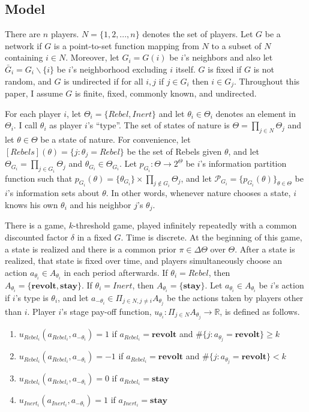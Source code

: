 \documentclass[12pt,letterpaper]{article}
\theoremstyle{definition}
\theoremstyle{remark}
\theoremstyle{claim}
\begin{document}
\subsection{Model}


There are $n$ players. $N=\{1,2,...,n\}$ denotes the set of players.  Let $G$ be a network if  $G$ is a point-to-set function mapping from $N$ to a subset of $N$ containing $i\in N$. Moreover,  let $G_i=G(i)$ be $i$'s neighbors and also let $\bar{G}_i=G_i\backslash \{i\}$ be $i$'s neighborhood excluding $i$ itself. $G$ is fixed if $G$ is not random, and $G$ is undirected if for all $i,j$ if $j\in G_i$ then $i\in G_j$. Throughout this paper, I assume $G$ is finite, fixed, commonly known, and undirected. 

For each player $i$, let $\Theta_i=\{Rebel,Inert\}$ and let $\theta_i\in \Theta_i$ denotes an element in $\Theta_i$. I call $\theta_i$ as player $i$'s ``type''. The set of states of nature is $\Theta=\prod_{j\in N}\Theta_j$ and let $\theta\in \Theta$ be a state of nature. For convenience, let $[Rebels](\theta)=\{j:\theta_j=Rebel\}$ be the set of Rebels given $\theta$, and let $\Theta_{G_i}=\prod_{j\in G_i}\Theta_j$ and $\theta_{G_i}\in \Theta_{G_i}$. Let $p_{G_i}:\Theta \rightarrow 2^{\Theta}$ be $i$'s information partition function such that $p_{G_i}(\theta)=\{\theta_{G_i}\}\times \prod_{j\not\in G_i}\Theta_j$, and let $\mathcal{P}_{G_i}=\{p_{G_i}(\theta)\}_{\theta\in \Theta}$ be $i$'s information sets about $\theta$. In other words, whenever nature chooses a state, $i$ knows his own $\theta_i$ and his neighbor $j$'s $\theta_j$. 

There is a game, $k$-threshold game, played infinitely repeatedly  with a common discounted factor $\delta$ in a fixed $G$. Time is discrete. At the beginning of this game, a state is realized and there is a common prior $\pi\in \Delta \Theta$ over $\Theta$. After a state is realized, that state is fixed over time, and players simultaneously choose an action $a_{\theta_i}\in A_{\theta_i}$ in each period afterwards. If $\theta_i=Rebel$, then $A_{\theta_i}=\{\textbf{revolt}, \textbf{stay}\}$.  If $\theta_i=Inert$, then $A_{\theta_i}=\{\textbf{stay}\}$. Let $a_{\theta_i}\in A_{\theta_i}$ be $i$'s action if $i$'s type is $\theta_i$, and let $a_{-\theta_i}\in \Pi_{j\in N,j\neq i}A_{\theta_j}$ be the actions taken by players other than $i$. Player $i$'s stage pay-off function, $u_{\theta_i}: \Pi_{j\in N}A_{\theta_j}\rightarrow \mathbb{R}$, is defined as follows. 
\begin{enumerate}
\item $u_{Rebel_i}(a_{Rebel_i},a_{-\theta_i})=1$ if $a_{Rebel_i}=\textbf{revolt}$ and $\#\{j:a_{\theta_j}=\textbf{revolt}\}\geq k$
\item $u_{Rebel_i}(a_{Rebel_i},a_{-\theta_i})=-1$ if $a_{Rebel_i}=\textbf{revolt}$ and $\#\{j:a_{\theta_j}=\textbf{revolt}\}< k$
\item $u_{Rebel_i}(a_{Rebel_i},a_{-\theta_i})=0$ if $a_{Rebel_i}=\textbf{stay}$
\item $u_{Inert_i}(a_{Inert_i},a_{-\theta_i})=1$ if $a_{Inert_i}=\textbf{stay}$
\end{enumerate}
\end{document}
